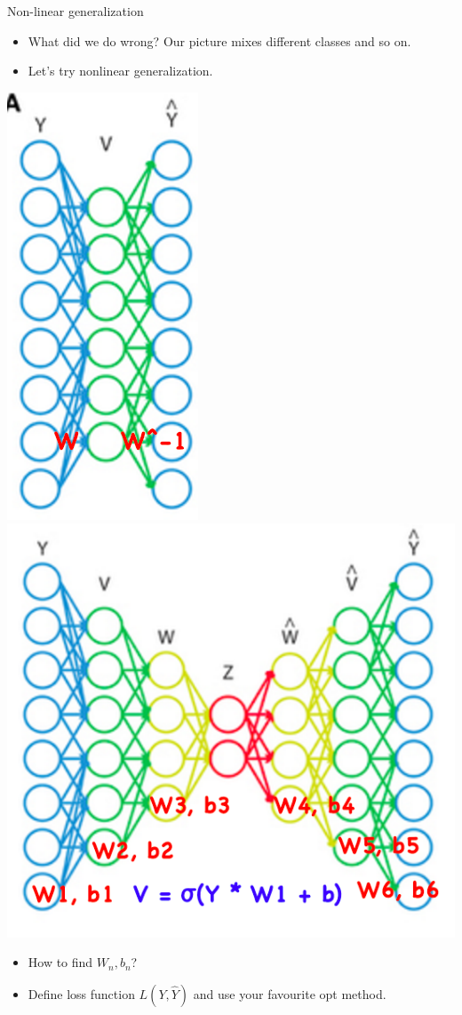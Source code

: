 \documentclass{beamer}
\begin{document}
\begin{frame}{Non-linear generalization}
	\begin{itemize}
		\item What did we do wrong? Our picture mixes different classes and so on.
		\item Let's try nonlinear generalization.
	\end{itemize}
	
	 \begin{center}
	 	\includegraphics[scale=0.3]{img/fcautoenc1} ~~~\includegraphics[scale=0.25]{img/fcautoenc2}		 
	 \end{center}
	
	\begin{itemize}
		\item How to find $W_n, b_n$? 
		\item Define loss function $L(Y, \hat{Y})$ and  use your favourite opt method.
	\end{itemize}
\end{frame}
\end{document}
